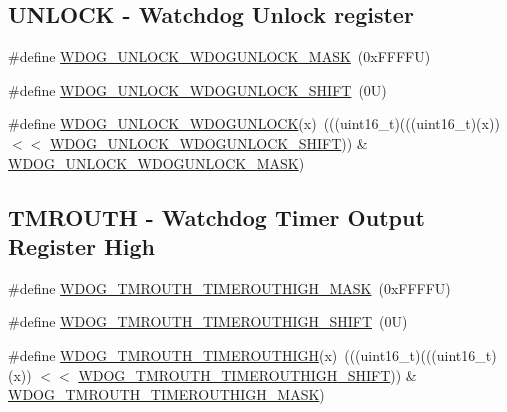 \subsection*{U\+N\+L\+O\+CK -\/ Watchdog Unlock register}
\begin{DoxyCompactItemize}
\item 
\#define \mbox{\hyperlink{group___w_d_o_g___register___masks_gadcf9026f6f2730a765e504ec4c7126a8}{W\+D\+O\+G\+\_\+\+U\+N\+L\+O\+C\+K\+\_\+\+W\+D\+O\+G\+U\+N\+L\+O\+C\+K\+\_\+\+M\+A\+SK}}~(0x\+F\+F\+F\+F\+U)
\item 
\#define \mbox{\hyperlink{group___w_d_o_g___register___masks_ga07ed92839744d67e4c393b00bc293246}{W\+D\+O\+G\+\_\+\+U\+N\+L\+O\+C\+K\+\_\+\+W\+D\+O\+G\+U\+N\+L\+O\+C\+K\+\_\+\+S\+H\+I\+FT}}~(0\+U)
\item 
\#define \mbox{\hyperlink{group___w_d_o_g___register___masks_gad96dca67e74ad54ec68edec38214cbc6}{W\+D\+O\+G\+\_\+\+U\+N\+L\+O\+C\+K\+\_\+\+W\+D\+O\+G\+U\+N\+L\+O\+CK}}(x)~(((uint16\+\_\+t)(((uint16\+\_\+t)(x)) $<$$<$ \mbox{\hyperlink{group___w_d_o_g___register___masks_ga07ed92839744d67e4c393b00bc293246}{W\+D\+O\+G\+\_\+\+U\+N\+L\+O\+C\+K\+\_\+\+W\+D\+O\+G\+U\+N\+L\+O\+C\+K\+\_\+\+S\+H\+I\+FT}})) \& \mbox{\hyperlink{group___w_d_o_g___register___masks_gadcf9026f6f2730a765e504ec4c7126a8}{W\+D\+O\+G\+\_\+\+U\+N\+L\+O\+C\+K\+\_\+\+W\+D\+O\+G\+U\+N\+L\+O\+C\+K\+\_\+\+M\+A\+SK}})
\end{DoxyCompactItemize}
\subsection*{T\+M\+R\+O\+U\+TH -\/ Watchdog Timer Output Register High}
\begin{DoxyCompactItemize}
\item 
\#define \mbox{\hyperlink{group___w_d_o_g___register___masks_ga4c46affdc0cd5ed2cde734812f783d31}{W\+D\+O\+G\+\_\+\+T\+M\+R\+O\+U\+T\+H\+\_\+\+T\+I\+M\+E\+R\+O\+U\+T\+H\+I\+G\+H\+\_\+\+M\+A\+SK}}~(0x\+F\+F\+F\+F\+U)
\item 
\#define \mbox{\hyperlink{group___w_d_o_g___register___masks_ga6565e44e33822cee4835856bfb88431e}{W\+D\+O\+G\+\_\+\+T\+M\+R\+O\+U\+T\+H\+\_\+\+T\+I\+M\+E\+R\+O\+U\+T\+H\+I\+G\+H\+\_\+\+S\+H\+I\+FT}}~(0\+U)
\item 
\#define \mbox{\hyperlink{group___w_d_o_g___register___masks_ga6d47e0fbb5b3a15c1bec6418031960a0}{W\+D\+O\+G\+\_\+\+T\+M\+R\+O\+U\+T\+H\+\_\+\+T\+I\+M\+E\+R\+O\+U\+T\+H\+I\+GH}}(x)~(((uint16\+\_\+t)(((uint16\+\_\+t)(x)) $<$$<$ \mbox{\hyperlink{group___w_d_o_g___register___masks_ga6565e44e33822cee4835856bfb88431e}{W\+D\+O\+G\+\_\+\+T\+M\+R\+O\+U\+T\+H\+\_\+\+T\+I\+M\+E\+R\+O\+U\+T\+H\+I\+G\+H\+\_\+\+S\+H\+I\+FT}})) \& \mbox{\hyperlink{group___w_d_o_g___register___masks_ga4c46affdc0cd5ed2cde734812f783d31}{W\+D\+O\+G\+\_\+\+T\+M\+R\+O\+U\+T\+H\+\_\+\+T\+I\+M\+E\+R\+O\+U\+T\+H\+I\+G\+H\+\_\+\+M\+A\+SK}})
\end{DoxyCompactItemize}
